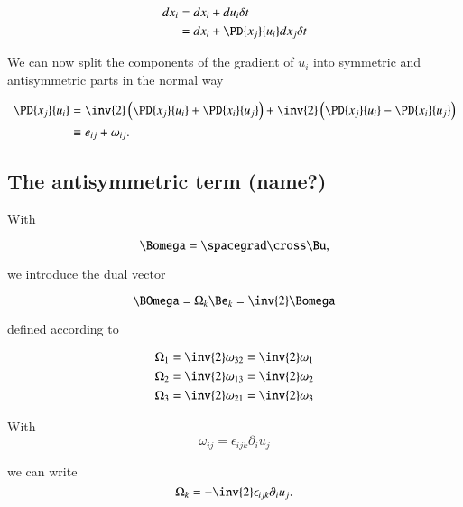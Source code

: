 \begin{equation}\label{eqn:continuumL9:30}
\begin{aligned}
dx_i 
&= dx_i + du_i \delta t \\
&= dx_i + \PD{x_j}{u_i} dx_j \delta t 
\end{aligned}
\end{equation}

We can now split the components of the gradient of $u_i$ into symmetric and antisymmetric parts in the normal way

\begin{equation}\label{eqn:continuumL9:50}
\begin{aligned}
\PD{x_j}{u_i}
&= 
\inv{2} \left( 
\PD{x_j}{u_i}
+\PD{x_i}{u_j}
\right)
+
\inv{2} \left( 
\PD{x_j}{u_i}
-\PD{x_i}{u_j}
\right) \\
&\equiv e_{ij} + \omega_{ij}.
\end{aligned}
\end{equation}

\subsection{The antisymmetric term (name?)}

With

\begin{equation}\label{eqn:continuumL9:70}
\Bomega = \spacegrad \cross \Bu,
\end{equation}

we introduce the dual vector 

\begin{equation}\label{eqn:continuumL9:90}
\BOmega = \Omega_k \Be_k = \inv{2} \Bomega
\end{equation}

defined according to

\begin{align}\label{eqn:continuumL9:110}
\Omega_1 &= \inv{2} \omega_{32} = \inv{2} \omega_1 \\
\Omega_2 &= \inv{2} \omega_{13} = \inv{2} \omega_2 \\
\Omega_3 &= \inv{2} \omega_{21} = \inv{2} \omega_3 
\end{align}

With 
\begin{equation}\label{eqn:continuumL9:610}
\omega_{ij}
= \epsilon_{ijk} \partial_i u_j
\end{equation}

we can write
\begin{equation}\label{eqn:continuumL9:590}
\Omega_k = -\inv{2} \epsilon_{ijk} \partial_i u_j.
\end{equation}


